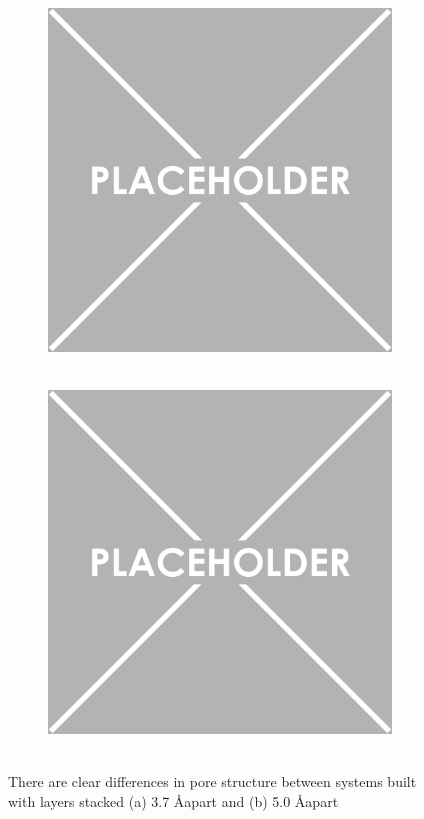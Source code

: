 \documentclass{article}
\newcommand{\angstrom}{\textup{\AA}}
\begin{document}
	\begin{figure}
	\centering
	\begin{subfigure}{.45\textwidth}
		\centering
		\includegraphics[width=\linewidth]{placeholder.png}
		\caption{~\label{fig:phaseA}}
	\end{subfigure}
	\begin{subfigure}{.45\textwidth}
		\includegraphics[width=\linewidth]{placeholder.png}
		\centering
		\caption{~\label{fig:phaseB}}
	\end{subfigure}
	\caption{There are clear differences in pore structure between systems built with layers stacked (a) 3.7 \angstrom apart and (b) 5.0 \angstrom apart}
	\label{fig:porestructures}
	\end{figure}
\end{document}
